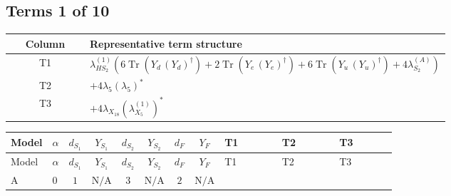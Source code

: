 \documentclass[8pt]{article}
\begin{document}
\begin{landscape}
\subsection*{Terms 1 of 10}
\begin{center}
\begin{tabular}{@{}c >{\raggedright\arraybackslash}p{0.82\linewidth}@{}}
\toprule
Column & Representative term structure \\
\midrule
T1 & \(\displaystyle {\lambda_{HS_2}^{(1)}} (6 \operatorname{Tr}\!\left({Y_d}\,\left({Y_d}\right)^{\dagger}\right)+2 \operatorname{Tr}\!\left({Y_e}\,\left({Y_e}\right)^{\dagger}\right)+6 \operatorname{Tr}\!\left({Y_u}\,\left({Y_u}\right)^{\dagger}\right)+4 {\lambda_{S_2}^{(A)}})\) \\
\midrule
T2 & \(\displaystyle +4 {\lambda_5} \left({\lambda_5}\right)^{*}\) \\
\midrule
T3 & \(\displaystyle +4 {\lambda_{X_{18}}} \left({\lambda_{X_{5}}^{(1)}}\right)^{*}\) \\
\midrule
\bottomrule
\end{tabular}
\end{center}
\smallskip
\tiny
\begin{longtable}{@{}llcccccc >{\raggedright\arraybackslash}p{0.21\linewidth} >{\raggedright\arraybackslash}p{0.21\linewidth} >{\raggedright\arraybackslash}p{0.21\linewidth}@{}}
\toprule
Model & $\alpha$ & $d_{S_1}$ & $Y_{S_1}$ & $d_{S_2}$ & $Y_{S_2}$ & $d_F$ & $Y_F$ & T1 & T2 & T3 \\
\midrule
\endfirsthead
\toprule
Model & $\alpha$ & $d_{S_1}$ & $Y_{S_1}$ & $d_{S_2}$ & $Y_{S_2}$ & $d_F$ & $Y_F$ & T1 & T2 & T3 \\
\midrule
\endhead
A & $0$ & $1$ & $\text{N/A}$ & $3$ & $\text{N/A}$ & $2$ & $\text{N/A}$ & \scriptsize\adjustbox{max width=\linewidth}{$\begin{gathered} {\lambda_{HS_2}^{(1)}} (6 \operatorname{Tr}\!\left({Y_d}\,\left({Y_d}\right)^{\dagger}\right)+2 \operatorname{Tr}\!\left({Y_e}\,\left({Y_e}\right)^{\dagger}\right)+6 \operatorname{Tr}\!\left({Y_u}\,\left({Y_u}\right)^{\dagger}\right)+4 {\lambda_{S_2}^{(A)}})\end{gathered}$} & \scriptsize\adjustbox{max width=\linewidth}{$\begin{gathered} +4 {\lambda_5} \left({\lambda_5}\right)^{*}\end{gathered}$} & \scriptsize\adjustbox{max width=\linewidth}{$\begin{gathered} +4 {\lambda_{X_{18}}} \left({\lambda_{X_{5}}^{(1)}}\right)^{*}\end{gathered}$} \\

\end{longtable}
\end{landscape}
\end{document}
